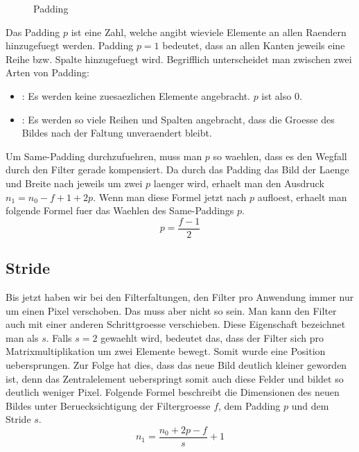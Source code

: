\begin{figure}[h!]

  \caption{Padding}
\end{figure}

Das Padding $p$ ist eine Zahl, welche angibt wieviele Elemente an allen Raendern
hinzugefuegt werden. Padding $p = 1$ bedeutet, dass an allen Kanten jeweils eine
Reihe bzw. Spalte hinzugefuegt wird.
Begrifflich unterscheidet man zwischen zwei Arten von Padding:
\begin{itemize}
\item{: Es werden keine zuesaezlichen Elemente angebracht. $p$ ist also 0.}
\item{: Es werden so viele Reihen und Spalten angebracht, dass
    die Groesse des Bildes nach der Faltung unveraendert bleibt.}
\end{itemize}
\para{}
Um Same-Padding durchzufuehren, muss man $p$ so waehlen, dass es den Wegfall durch
den Filter gerade kompensiert. Da durch das Padding das Bild der Laenge und
Breite nach jeweils um zwei $p$ laenger wird, erhaelt man den Ausdruck $n_1 =
n_0 - f + 1 + 2p$. Wenn man diese Formel jetzt nach $p$ aufloest,
erhaelt man folgende Formel fuer das Waehlen des Same-Paddings $p$.
\\
\begin{equation}
  p = \frac{f-1}{2}
\end{equation}

\cite{deeplearning.ai:cnn}

\subsection{Stride}
Bis jetzt haben wir bei den Filterfaltungen, den Filter pro Anwendung immer nur
um einen Pixel verschoben. Das muss aber nicht so sein. Man kann den Filter
auch mit einer anderen Schrittgroesse verschieben. Diese Eigenschaft bezeichnet
man als  $s$. Falls $s = 2$ gewaehlt wird, bedeutet das, dass der
Filter sich pro Matrixmultiplikation um zwei Elemente bewegt. Somit wurde eine
Position uebersprungen. Zur Folge hat dies, dass das neue Bild
deutlich kleiner geworden ist, denn das Zentralelement ueberspringt somit auch
diese Felder und bildet so deutlich weniger Pixel.
\para{}
Folgende Formel beschreibt die Dimensionen des neuen Bildes unter
Beruecksichtigung der Filtergroesse $f$, dem Padding $p$ und dem Stride $s$.
\\
\begin{equation}
  n_1 = \frac{n_0 + 2p - f}{s} + 1
\end{equation}

